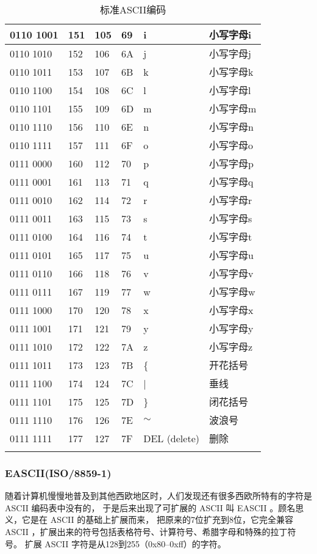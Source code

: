 \begin{longtable}{| p{.10\linewidth} | p{.08\linewidth} | p{.08\linewidth} | p{.10\linewidth} | p{.28\linewidth} | p{.15\linewidth} |}
0110 1001 & 151 & 105 & 69 & i & 小写字母i \\ \hline
0110 1010 & 152 & 106 & 6A & j & 小写字母j \\ \hline
0110 1011 & 153 & 107 & 6B & k & 小写字母k \\ \hline
0110 1100 & 154 & 108 & 6C & l & 小写字母l \\ \hline
0110 1101 & 155 & 109 & 6D & m & 小写字母m \\ \hline
0110 1110 & 156 & 110 & 6E & n & 小写字母n \\ \hline
0110 1111 & 157 & 111 & 6F & o & 小写字母o \\ \hline
0111 0000 & 160 & 112 & 70 & p & 小写字母p \\ \hline
0111 0001 & 161 & 113 & 71 & q & 小写字母q \\ \hline
0111 0010 & 162 & 114 & 72 & r & 小写字母r \\ \hline
0111 0011 & 163 & 115 & 73 & s & 小写字母s \\ \hline
0111 0100 & 164 & 116 & 74 & t & 小写字母t \\ \hline
0111 0101 & 165 & 117 & 75 & u & 小写字母u \\ \hline
0111 0110 & 166 & 118 & 76 & v & 小写字母v \\ \hline
0111 0111 & 167 & 119 & 77 & w & 小写字母w \\ \hline
0111 1000 & 170 & 120 & 78 & x & 小写字母x \\ \hline
0111 1001 & 171 & 121 & 79 & y & 小写字母y \\ \hline
0111 1010 & 172 & 122 & 7A & z & 小写字母z \\ \hline
0111 1011 & 173 & 123 & 7B & \{ & 开花括号 \\ \hline
0111 1100 & 174 & 124 & 7C & | & 垂线 \\ \hline
0111 1101 & 175 & 125 & 7D & \} & 闭花括号 \\ \hline
0111 1110 & 176 & 126 & 7E & $\sim$  & 波浪号 \\ \hline
0111 1111 & 177 & 127 & 7F & DEL (delete) & 删除 \\ \hline
\caption{标准ASCII编码}
\label{table:ascii}
\centering
\end{longtable}

\subsubsection{EASCII(ISO/8859-1)}
随着计算机慢慢地普及到其他西欧地区时，人们发现还有很多西欧所特有的字符是 ASCII 编码表中没有的，
于是后来出现了可扩展的 ASCII 叫 EASCII 。顾名思义，它是在 ASCII 的基础上扩展而来，
把原来的7位扩充到8位，它完全兼容 ASCII ，扩展出来的符号包括表格符号、计算符号、希腊字母和特殊的拉丁符号。
扩展 ASCII 字符是从128到255（0x80--0xff）的字符。

